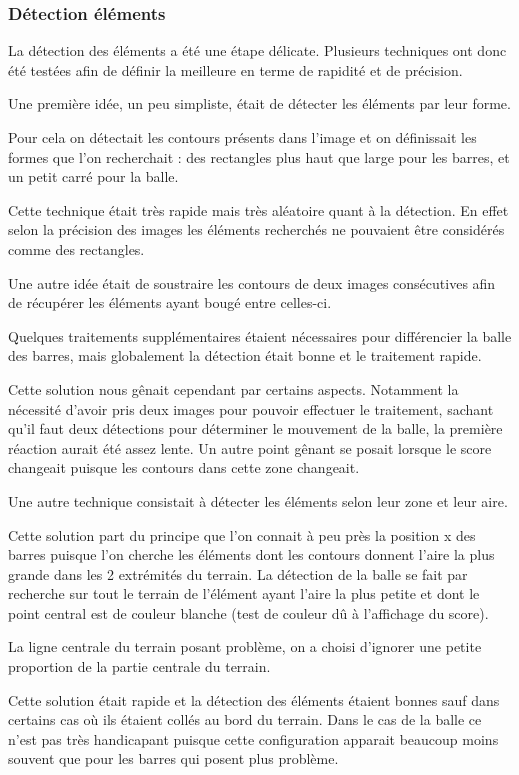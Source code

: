 \subsubsection{Détection éléments}
\label{subs:Détection éléments}
\par La détection des éléments a été une étape délicate. Plusieurs techniques ont donc été testées afin de définir la meilleure en terme de rapidité et de précision.

\par Une première idée, un peu simpliste, était de détecter les éléments par leur forme. 
\par Pour cela on détectait les contours présents dans l'image et on définissait les formes que l'on recherchait : des rectangles plus haut que large pour les barres, et un petit carré pour la balle.
\par Cette technique était très rapide mais très aléatoire quant à la détection. En effet selon la précision des images  les éléments recherchés ne pouvaient être considérés comme des rectangles.

\par Une autre idée était de soustraire les contours de deux images consécutives afin de récupérer les éléments ayant bougé entre celles-ci.
\par Quelques traitements supplémentaires étaient nécessaires pour différencier la balle des barres, mais globalement la détection était bonne et le traitement rapide.
\par Cette solution nous gênait cependant par certains aspects. Notamment la nécessité d'avoir pris deux images pour pouvoir effectuer le traitement, sachant qu'il faut deux détections pour déterminer le mouvement de la balle, la première réaction aurait été assez lente. Un autre point gênant se posait lorsque le score changeait puisque les contours dans cette zone changeait.

\par Une autre technique consistait à détecter les éléments selon leur zone et leur aire.
\par Cette solution part du principe que l'on connait à peu près la position x des barres puisque l'on cherche les éléments dont les contours donnent l'aire la plus grande dans les 2 extrémités du terrain. La détection de la balle se fait par recherche sur tout le terrain de l'élément ayant l'aire la plus petite et dont le point central est de couleur blanche (test de couleur dû à l'affichage du score).
\par La ligne centrale du terrain posant problème, on a choisi d'ignorer une petite proportion de la partie centrale du terrain.
\par Cette solution était rapide et la détection des éléments étaient bonnes sauf dans certains cas où ils étaient collés au bord du terrain. Dans le cas de la balle ce n'est pas très handicapant puisque cette configuration apparait beaucoup moins souvent que pour les barres qui posent plus problème.

